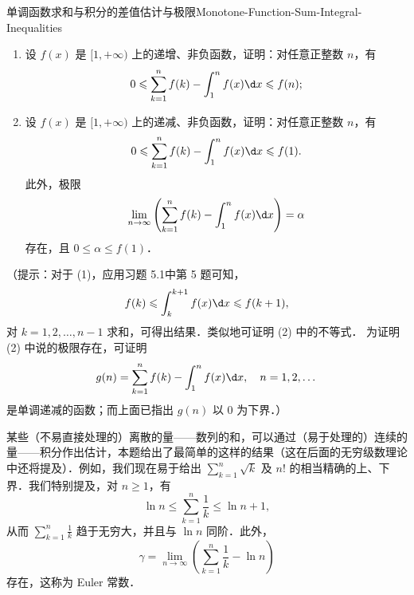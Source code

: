 \begin{problem}{单调函数求和与积分的差值估计与极限}{Monotone-Function-Sum-Integral-Inequalities}
    \begin{enumerate}
        \item 设 $f(x)$ 是 $[1, +\infty)$ 上的递增、非负函数，证明：对任意正整数 $n$，有
              \begin{equation}
                  0 \leqslant \sum_{k=1}^n f(k) - \int_1^n f(x) \d x \leqslant f(n);
              \end{equation}
        \item 设 $f(x)$ 是 $[1, +\infty)$ 上的递减、非负函数，证明：对任意正整数 $n$，有
              \begin{equation}
                  0 \leqslant \sum_{k=1}^n f(k) - \int_1^n f(x) \d x \leqslant f(1).
              \end{equation}
              此外，极限
              \begin{equation}
                  \lim_{n\to\infty} \left( \sum_{k=1}^n f(k) - \int_1^n f(x) \d x \right) = \alpha
              \end{equation}
              存在，且 $0 \leqslant \alpha \leqslant f(1)$．
    \end{enumerate}
    （提示：对于 (1)，应用习题 5.1中第 5 题可知，
    \begin{equation}
        f(k) \leqslant \int_k^{k+1} f(x) \d x \leqslant f(k+1),
    \end{equation}
    对 $k = 1, 2, \dots, n-1$ 求和，可得出结果．类似地可证明 (2) 中的不等式．
    为证明 (2) 中说的极限存在，可证明
    \begin{equation}
        g(n) = \sum_{k=1}^n f(k) - \int_1^n f(x) \d x, \quad n = 1, 2, \dots
    \end{equation}
    是单调递减的函数；而上面已指出 $g(n)$ 以 $0$ 为下界．）

    某些（不易直接处理的）离散的量——数列的和，可以通过（易于处理的）连续的量——积分作出估计，本题给出了最简单的这样的结果（这在后面的无穷级数理论中还将提及）．例如，我们现在易于给出 $\sum_{k=1}^n \sqrt{k}$ 及 $n!$ 的相当精确的上、下界．我们特别提及，对 $n \geqslant 1$，有
    \begin{equation}
        \ln n \leqslant \sum_{k=1}^n \frac{1}{k} \leqslant \ln n + 1,
    \end{equation}
    从而 $\sum_{k=1}^n \frac{1}{k}$ 趋于无穷大，并且与 $\ln n$ 同阶．此外，
    \begin{equation}
        \gamma = \lim_{n\to\infty} \left( \sum_{k=1}^n \frac{1}{k} - \ln n \right)
    \end{equation}
    存在，这称为 Euler 常数．
\end{problem}

